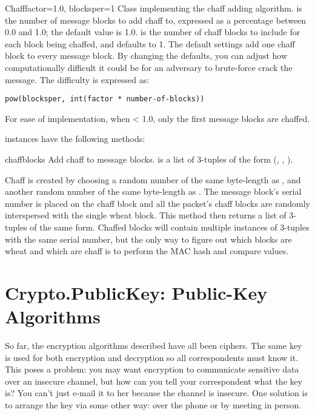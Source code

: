 \documentclass{howto}
\begin{document}
\begin{classdesc}{Chaff}{factor=1.0, blocksper=1}
Class implementing the chaff adding algorithm.
 is the number of message blocks
            to add chaff to, expressed as a percentage between 0.0 and 1.0; the default value is 1.0.
 is the number of chaff blocks to include for each block
            being chaffed, and defaults to 1.  The default settings
add one chaff block to every
            message block.  By changing the defaults, you can adjust how
            computationally difficult it could be for an adversary to
            brute-force crack the message.  The difficulty is expressed as:

\begin{verbatim}
pow(blocksper, int(factor * number-of-blocks))
\end{verbatim}

For ease of implementation, when  < 1.0, only the first
 message blocks are chaffed.
\end{classdesc}

 instances have the following methods:

\begin{methoddesc}{chaff}{blocks}
Add chaff to message blocks.   is a list of 3-tuples of the
form (, , ).

Chaff is created by choosing a random number of the same
byte-length as , and another random number of the same
byte-length as .  The message block's serial number is placed
on the chaff block and all the packet's chaff blocks are randomly
interspersed with the single wheat block.  This method then
returns a list of 3-tuples of the same form.  Chaffed blocks will
contain multiple instances of 3-tuples with the same serial
number, but the only way to figure out which blocks are wheat and
which are chaff is to perform the MAC hash and compare values.
\end{methoddesc}


\section{Crypto.PublicKey: Public-Key Algorithms}
So far, the encryption algorithms described have all been  ciphers.  The same key is used for both encryption and decryption
so all correspondents must know it.  This poses a problem: you may
want encryption to communicate sensitive data over an insecure
channel, but how can you tell your correspondent what the key is?  You
can't just e-mail it to her because the channel is insecure.  One
solution is to arrange the key via some other way: over the phone or
by meeting in person.
\end{document}
